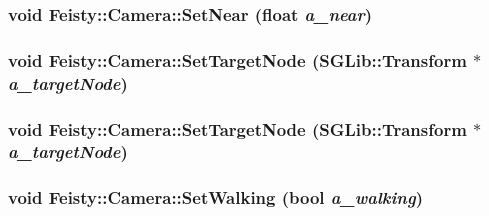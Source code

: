\hypertarget{class_feisty_1_1_camera_a58228535280e133cc8a40dc20eed6454}{
\subsubsection[{SetNear}]{\setlength{\rightskip}{0pt plus 5cm}void Feisty::Camera::SetNear (float {\em a\_\-near})}}
\label{class_feisty_1_1_camera_a58228535280e133cc8a40dc20eed6454}
\hypertarget{class_feisty_1_1_camera_a0e3faebd081573eecbe40c4551926919}{
\subsubsection[{SetTargetNode}]{\setlength{\rightskip}{0pt plus 5cm}void Feisty::Camera::SetTargetNode (SGLib::Transform $\ast$ {\em a\_\-targetNode})}}
\label{class_feisty_1_1_camera_a0e3faebd081573eecbe40c4551926919}
\hypertarget{class_feisty_1_1_camera_a0e3faebd081573eecbe40c4551926919}{
\subsubsection[{SetTargetNode}]{\setlength{\rightskip}{0pt plus 5cm}void Feisty::Camera::SetTargetNode (SGLib::Transform $\ast$ {\em a\_\-targetNode})}}
\label{class_feisty_1_1_camera_a0e3faebd081573eecbe40c4551926919}
\hypertarget{class_feisty_1_1_camera_a8392192850c1bece0cc923001f4479b9}{
\subsubsection[{SetWalking}]{\setlength{\rightskip}{0pt plus 5cm}void Feisty::Camera::SetWalking (bool {\em a\_\-walking})}}
\label{class_feisty_1_1_camera_a8392192850c1bece0cc923001f4479b9}
